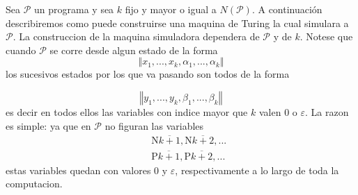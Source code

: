 \begin{frame}
	Sea $\mathcal{P}$ un programa y sea $k$ fijo y mayor o igual a $N(\mathcal{P})$. A continuación describiremos como puede construirse una maquina de
	Turing la cual simulara a $\mathcal{P}$. La construccion de la maquina
	simuladora dependera de $\mathcal{P}$ y de $k$. Notese que cuando $\mathcal{P%
	}$ se corre desde algun estado de la forma%
	\begin{equation*}
	\left\Vert x_{1},...,x_{k},\alpha _{1},...,\alpha _{k}\right\Vert
	\end{equation*}%
	los sucesivos estados por los que va pasando son todos de la forma

	\begin{equation*}
	\left\Vert y_{1},...,y_{k},\beta _{1},...,\beta _{k}\right\Vert
	\end{equation*}%
	es decir en todos ellos las variables con indice mayor que $k$ valen $0$ o $%
	\varepsilon $. La razon es simple: ya que en $\mathcal{P}$ no figuran las
	variables%
	\begin{eqnarray*}
	&&\mathrm{N}\overline{k+1},\mathrm{N}\overline{k+2},... \\
	&&\mathrm{P}\overline{k+1},\mathrm{P}\overline{k+2},...
	\end{eqnarray*}%
	estas variables quedan con valores $0$ y $\varepsilon $, respectivamente a
	lo largo de toda la computacion.
\end{frame}
